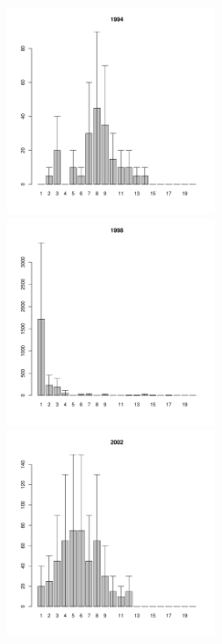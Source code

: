 \documentclass[12pt, a4paper]{article}
\begin{document}
\begin{figure}[h]
\begin{multicols}{3}
\hfill
\includegraphics[width=60mm]{../White_Sea/Luvenga_Goreliy/low_1994_.pdf}
\hfill
\includegraphics[width=60mm]{../White_Sea/Luvenga_Goreliy/low_1998_.pdf}
\hfill
\includegraphics[width=60mm]{../White_Sea/Luvenga_Goreliy/low_2002_.pdf}
\end{multicols}



\end{figure}
\end{document}
